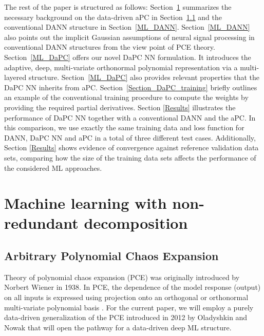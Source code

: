 \documentclass[a4paper,fleqn]{article}
\newcommand{\rw}[1]{\textcolor{blue}{#1}}
\newcommand{\del}[1]{\textcolor{red}{\sout{#1}}}
\renewcommand{\del}[1]{}
\renewcommand{\rw}[1]{#1}
\begin{document}
The rest of the paper is structured as follows: Section~\ref{ML} summarizes the necessary background on the data-driven aPC in Section~\ref{ML_aPC} and the conventional DANN structure in Section~\ref{ML_DANN}. Section~\ref{ML_DANN} also points out the implicit Gaussian assumptions of neural signal processing in conventional DANN structures from the view point of PCE theory. Section~\ref{ML_DaPC} offers our novel DaPC NN formulation. It introduces the adaptive, deep, multi-variate orthonormal polynomial representation via a multi-layered structure. Section~\ref{ML_DaPC} also provides relevant properties that the DaPC NN inherits \del{form} \rw{from} aPC. Section~\ref{Section_DaPC_training} briefly outlines an example of the conventional training procedure to compute the weights by providing the required partial derivatives. Section \ref{Results} illustrates the performance of DaPC NN together with a conventional DANN and the aPC. In this comparison, we use exactly the same training data and loss function for DANN, DaPC NN and aPC in a total of three different test cases. %
Additionally, Section \ref{Results} shows evidence of convergence against reference validation data sets, \rw{comparing } \del{compering} how the size of the training data sets affects the performance of the considered ML approaches.



\section{Machine learning with non-redundant decomposition}
\label{ML}

\subsection{Arbitrary Polynomial Chaos Expansion}
\label{ML_aPC}
Theory of polynomial chaos expansion (PCE) was originally introduced by Norbert Wiener \cite{Wiener1938} in 1938. In PCE, the dependence of the model response (output) on all inputs is expressed using projection onto an orthogonal or orthonormal multi-variate polynomial basis \cite{Ghanem_Spanos_1991_SFEM_book,MR3364576}. For the current paper, we will employ a purely data-driven generalization of the PCE introduced in 2012 by Oladyshkin and Nowak \cite{OladNowak_RESS2012} that will open the pathway for a data-driven deep ML structure. 
\end{document}
